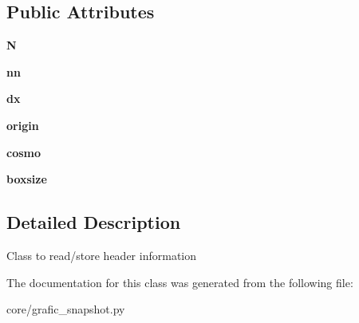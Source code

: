\subsection*{Public Attributes}
\begin{DoxyCompactItemize}
\item 
\hypertarget{classseren3_1_1core_1_1grafic__snapshot_1_1GrafICHeader_ae5ad71c27c4fa9f3c95d1deb8c3b63d3}{
{\bfseries N}}
\label{classseren3_1_1core_1_1grafic__snapshot_1_1GrafICHeader_ae5ad71c27c4fa9f3c95d1deb8c3b63d3}

\item 
\hypertarget{classseren3_1_1core_1_1grafic__snapshot_1_1GrafICHeader_a9410edbbff76f29c912b3d14c3cb9502}{
{\bfseries nn}}
\label{classseren3_1_1core_1_1grafic__snapshot_1_1GrafICHeader_a9410edbbff76f29c912b3d14c3cb9502}

\item 
\hypertarget{classseren3_1_1core_1_1grafic__snapshot_1_1GrafICHeader_a90c67e0a59b38044ffb72357bb8f8011}{
{\bfseries dx}}
\label{classseren3_1_1core_1_1grafic__snapshot_1_1GrafICHeader_a90c67e0a59b38044ffb72357bb8f8011}

\item 
\hypertarget{classseren3_1_1core_1_1grafic__snapshot_1_1GrafICHeader_a4ac8523b779885f969940795d9c26e53}{
{\bfseries origin}}
\label{classseren3_1_1core_1_1grafic__snapshot_1_1GrafICHeader_a4ac8523b779885f969940795d9c26e53}

\item 
\hypertarget{classseren3_1_1core_1_1grafic__snapshot_1_1GrafICHeader_a56f56f1d69cf4984891aca8bcf8fb582}{
{\bfseries cosmo}}
\label{classseren3_1_1core_1_1grafic__snapshot_1_1GrafICHeader_a56f56f1d69cf4984891aca8bcf8fb582}

\item 
\hypertarget{classseren3_1_1core_1_1grafic__snapshot_1_1GrafICHeader_aec11bed54ff2bb41bc3bdfbe9c80f3b8}{
{\bfseries boxsize}}
\label{classseren3_1_1core_1_1grafic__snapshot_1_1GrafICHeader_aec11bed54ff2bb41bc3bdfbe9c80f3b8}

\end{DoxyCompactItemize}


\subsection{Detailed Description}
\begin{DoxyVerb}
Class to read/store header information
\end{DoxyVerb}
 

The documentation for this class was generated from the following file:\begin{DoxyCompactItemize}
\item 
core/grafic\_\-snapshot.py\end{DoxyCompactItemize}
